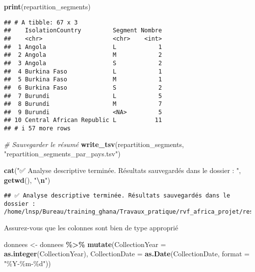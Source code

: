 \documentclass[
]{article}
\newenvironment{Shaded}{\begin{snugshade}}{\end{snugshade}}
\newcommand{\AttributeTok}[1]{\textcolor[rgb]{0.13,0.29,0.53}{#1}}
\newcommand{\CommentTok}[1]{\textcolor[rgb]{0.56,0.35,0.01}{\textit{#1}}}
\newcommand{\FunctionTok}[1]{\textcolor[rgb]{0.13,0.29,0.53}{\textbf{#1}}}
\newcommand{\NormalTok}[1]{#1}
\newcommand{\OtherTok}[1]{\textcolor[rgb]{0.56,0.35,0.01}{#1}}
\newcommand{\SpecialCharTok}[1]{\textcolor[rgb]{0.81,0.36,0.00}{\textbf{#1}}}
\newcommand{\StringTok}[1]{\textcolor[rgb]{0.31,0.60,0.02}{#1}}
\begin{document}
\begin{Shaded}
\begin{Highlighting}[]
\FunctionTok{print}\NormalTok{(repartition\_segments)}
\end{Highlighting}
\end{Shaded}

\begin{verbatim}
## # A tibble: 67 x 3
##    IsolationCountry         Segment Nombre
##    <chr>                    <chr>    <int>
##  1 Angola                   L            1
##  2 Angola                   M            2
##  3 Angola                   S            2
##  4 Burkina Faso             L            1
##  5 Burkina Faso             M            1
##  6 Burkina Faso             S            2
##  7 Burundi                  L            5
##  8 Burundi                  M            7
##  9 Burundi                  <NA>         5
## 10 Central African Republic L           11
## # i 57 more rows
\end{verbatim}

\begin{Shaded}
\begin{Highlighting}[]
\CommentTok{\# Sauvegarder le résumé}
\FunctionTok{write\_tsv}\NormalTok{(repartition\_segments, }\StringTok{"repartition\_segments\_par\_pays.tsv"}\NormalTok{)}

\FunctionTok{cat}\NormalTok{(}\StringTok{"✅ Analyse descriptive terminée. Résultats sauvegardés dans le dossier : "}\NormalTok{,}
    \FunctionTok{getwd}\NormalTok{(), }\StringTok{"}\SpecialCharTok{\textbackslash{}n}\StringTok{"}\NormalTok{)}
\end{Highlighting}
\end{Shaded}

\begin{verbatim}
## ✅ Analyse descriptive terminée. Résultats sauvegardés dans le dossier :  /home/lnsp/Bureau/training_ghana/Travaux_pratique/rvf_africa_projet/resultats
\end{verbatim}

Assurez-vous que les colonnes sont bien de type approprié

\begin{Shaded}
\begin{Highlighting}[]
\NormalTok{donnees }\OtherTok{\textless{}{-}}\NormalTok{ donnees }\SpecialCharTok{\%\textgreater{}\%}
  \FunctionTok{mutate}\NormalTok{(}\AttributeTok{CollectionYear =} \FunctionTok{as.integer}\NormalTok{(CollectionYear),}
         \AttributeTok{CollectionDate =} \FunctionTok{as.Date}\NormalTok{(CollectionDate, }\AttributeTok{format =} \StringTok{"\%Y{-}\%m{-}\%d"}\NormalTok{))}
\end{Highlighting}
\end{Shaded}
\end{document}
